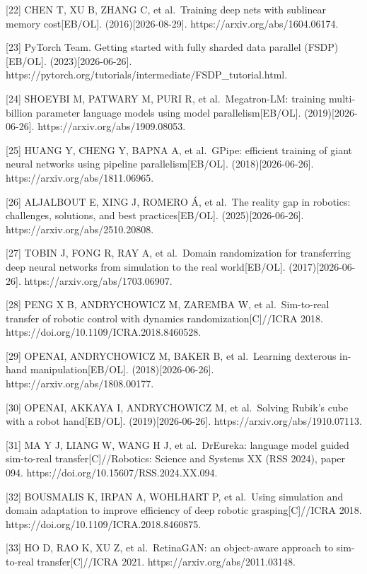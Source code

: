 \documentclass[
  chinese,
]{ctexart}
\begin{document}
{[}22{]} CHEN T, XU B, ZHANG C, et al.~Training deep nets with sublinear
memory cost{[}EB/OL{]}. (2016){[}2026-08-29{]}.
https://arxiv.org/abs/1604.06174.

{[}23{]} PyTorch Team. Getting started with fully sharded data parallel
(FSDP){[}EB/OL{]}. (2023){[}2026-06-26{]}.
https://pytorch.org/tutorials/intermediate/FSDP\_tutorial.html.

{[}24{]} SHOEYBI M, PATWARY M, PURI R, et al.~Megatron-LM: training
multi-billion parameter language models using model
parallelism{[}EB/OL{]}. (2019){[}2026-06-26{]}.
https://arxiv.org/abs/1909.08053.

{[}25{]} HUANG Y, CHENG Y, BAPNA A, et al.~GPipe: efficient training of
giant neural networks using pipeline parallelism{[}EB/OL{]}.
(2018){[}2026-06-26{]}. https://arxiv.org/abs/1811.06965.

{[}26{]} ALJALBOUT E, XING J, ROMERO Á, et al.~The reality gap in
robotics: challenges, solutions, and best practices{[}EB/OL{]}.
(2025){[}2026-06-26{]}. https://arxiv.org/abs/2510.20808.

{[}27{]} TOBIN J, FONG R, RAY A, et al.~Domain randomization for
transferring deep neural networks from simulation to the real
world{[}EB/OL{]}. (2017){[}2026-06-26{]}.
https://arxiv.org/abs/1703.06907.

{[}28{]} PENG X B, ANDRYCHOWICZ M, ZAREMBA W, et al.~Sim-to-real
transfer of robotic control with dynamics randomization{[}C{]}//ICRA
2018. https://doi.org/10.1109/ICRA.2018.8460528.

{[}29{]} OPENAI, ANDRYCHOWICZ M, BAKER B, et al.~Learning dexterous
in-hand manipulation{[}EB/OL{]}. (2018){[}2026-06-26{]}.
https://arxiv.org/abs/1808.00177.

{[}30{]} OPENAI, AKKAYA I, ANDRYCHOWICZ M, et al.~Solving Rubik's cube
with a robot hand{[}EB/OL{]}. (2019){[}2026-06-26{]}.
https://arxiv.org/abs/1910.07113.

{[}31{]} MA Y J, LIANG W, WANG H J, et al.~DrEureka: language model
guided sim-to-real transfer{[}C{]}//Robotics: Science and Systems XX
(RSS 2024), paper 094. https://doi.org/10.15607/RSS.2024.XX.094.

{[}32{]} BOUSMALIS K, IRPAN A, WOHLHART P, et al.~Using simulation and
domain adaptation to improve efficiency of deep robotic
grasping{[}C{]}//ICRA 2018. https://doi.org/10.1109/ICRA.2018.8460875.

{[}33{]} HO D, RAO K, XU Z, et al.~RetinaGAN: an object-aware approach
to sim-to-real transfer{[}C{]}//ICRA 2021.
https://arxiv.org/abs/2011.03148.
\end{document}
